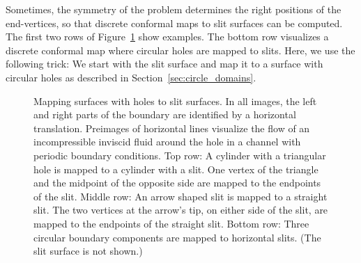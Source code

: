 \documentclass[Thesis]{subfiles}
\begin{document}
Sometimes, the symmetry of the problem determines the right positions
of the end-vertices, so that discrete conformal maps to slit surfaces
can be computed. The first two rows of Figure~\ref{fig:fluid_flows}
show examples. The bottom row visualizes a discrete conformal map
where circular holes are mapped to slits. Here, we use the following
trick: We start with the slit surface and map it to a surface with
circular holes as described in Section~\ref{sec:circle_domains}.
\begin{figure}
	\centering
        \caption{Mapping surfaces with holes to slit surfaces. In all
          images, the left and right parts of the boundary are
          identified by a horizontal translation. Preimages of
          horizontal lines visualize the flow of an incompressible
          inviscid fluid around the hole in a channel with periodic
          boundary conditions. Top row: A
          cylinder with a triangular hole is mapped to a cylinder with
          a slit. One vertex of the triangle and the midpoint of the
          opposite side are mapped to the endpoints of the
          slit. Middle row: An arrow shaped slit is mapped to a
          straight slit. The two vertices at the arrow's tip, on either
          side of the slit, are mapped to the endpoints of the
          straight slit. Bottom row: Three circular boundary
          components are mapped to horizontal slits. (The slit surface
          is not shown.)}
\label{fig:fluid_flows}
\end{figure}
\end{document}
